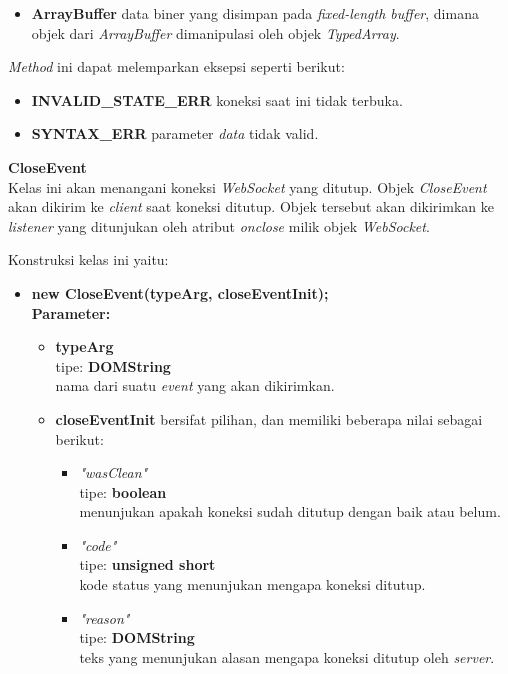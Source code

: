 \documentclass[a4paper,twoside]{article}
\begin{document}
\begin{enumerate}
\begin{enumerate}
\begin{itemize}
\begin{itemize}
					\item \textbf{ArrayBuffer} data biner yang disimpan pada \textit{fixed-length buffer}, dimana objek dari \textit{ArrayBuffer} dimanipulasi oleh objek \textit{TypedArray}.
				\end{itemize}
				\textit{Method} ini dapat melemparkan eksepsi seperti berikut:
				\begin{itemize}
					\item \textbf{INVALID\_STATE\_ERR} koneksi saat ini tidak terbuka.
					\item \textbf{SYNTAX\_ERR} parameter \textit{data} tidak valid.
				\end{itemize}
			\end{itemize}
			
			\textbf{CloseEvent} \\
			Kelas ini akan menangani koneksi \textit{WebSocket} yang ditutup. Objek \textit{CloseEvent} akan dikirim ke \textit{client} saat koneksi ditutup. Objek tersebut akan dikirimkan ke \textit{listener} yang ditunjukan oleh atribut \textit{onclose} milik objek \textit{WebSocket}.
			
			Konstruksi kelas ini yaitu:
			
			\begin{itemize}
				\item \textbf{new CloseEvent(typeArg, closeEventInit);} \\ \textbf{Parameter:} 
				\begin{itemize}
					\item \textbf{typeArg} \\ tipe: \textbf{DOMString} \\ nama dari suatu \textit{event} yang akan dikirimkan.
					\item \textbf{closeEventInit} bersifat pilihan, dan memiliki beberapa nilai sebagai berikut:
					\begin{itemize}
						\item \textit{"wasClean"} \\ tipe: \textbf{boolean} \\ menunjukan apakah koneksi sudah ditutup dengan baik atau belum.
						\item \textit{"code"} \\ tipe: \textbf{unsigned short} \\ kode status yang menunjukan mengapa koneksi ditutup.
						\item \textit{"reason"} \\ tipe: \textbf{DOMString} \\ teks yang menunjukan alasan mengapa koneksi ditutup oleh \textit{server}.
					\end{itemize}
				\end{itemize}
			\end{itemize}
			

\end{enumerate}
\end{enumerate}
\end{document}
